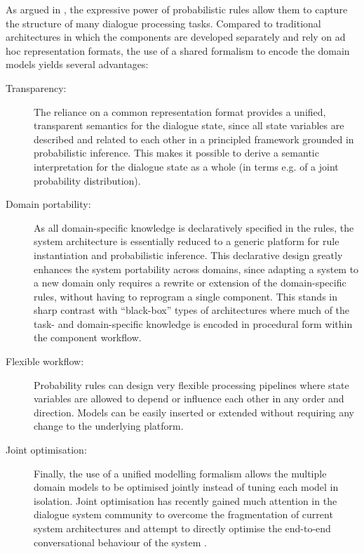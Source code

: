 As argued in \cite{lison-semdial2012}, the expressive power of probabilistic rules allow them to capture the structure of many dialogue processing tasks.  Compared to traditional architectures in which the components are developed separately and rely on ad hoc representation formats, the use of a shared formalism to encode the domain models yields several advantages:
\begin{description}
\item [Transparency: ] The reliance on a common representation format provides a unified, transparent semantics for the dialogue state, since all state variables are described and related to each other in a principled framework grounded in probabilistic inference.  This makes it possible to derive a semantic interpretation for the dialogue state as a whole (in terms e.g. of a joint probability distribution). 

\item [Domain portability: ]  As all domain-specific knowledge is declaratively specified in the rules, the system architecture is essentially reduced to a generic platform for rule instantiation and probabilistic inference.  This declarative design greatly enhances the system portability across domains, since adapting a system to a new domain only requires a rewrite or extension of the domain-specific rules, without having to reprogram a single component.  This stands in sharp contrast with ``black-box'' types of architectures where much of the task- and domain-specific knowledge is encoded in procedural form within the component workflow.

\item [Flexible workflow: ] Probability rules can design very flexible processing pipelines where state variables are allowed to depend or influence each other in any order and direction.  Models can be easily inserted or extended without requiring any change to the underlying platform. 

\item [Joint optimisation: ] Finally, the use of a unified modelling formalism allows the multiple domain models to be optimised jointly instead of tuning each model in isolation. Joint optimisation has recently gained much attention in the dialogue system community to overcome the fragmentation of current system architectures and attempt to directly optimise the end-to-end conversational behaviour of the system \citep{Lemon:2011}. 


\end{description}


